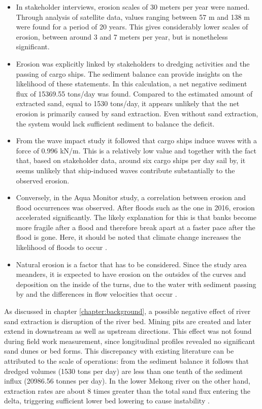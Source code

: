 \begin{itemize}
    \item In stakeholder interviews, erosion scales of 30 meters per year were named. Through analysis of satellite data, values ranging between 57 m and 138 m were found for a period of 20 years. This gives considerably lower scales of erosion, between around 3 and 7 meters per year, but is nonetheless significant.
    \item Erosion was explicitly linked by stakeholders to dredging activities and the passing of cargo ships. The sediment balance can provide insights on the likelihood of these statements. In this calculation, a net negative sediment flux of 15369.55 tons/day was found. Compared to the estimated amount of extracted sand, equal to 1530 tons/day, it appears unlikely that the net erosion is primarily caused by sand extraction. Even without sand extraction, the system would lack sufficient sediment to balance the deficit.
    \item From the wave impact study it followed that cargo ships induce waves with a force of 0.996 kN/m. This is a relatively low value and together with the fact that, based on stakeholder data, around six cargo ships per day sail by, it seems unlikely that ship-induced waves contribute substantially to the observed erosion.
    \item Conversely, in the Aqua Monitor study, a correlation between erosion and flood occurrences was observed. After floods such as the one in 2016, erosion accelerated significantly. The likely explanation for this is that banks become more fragile after a flood and therefore break apart at a faster pace after the flood is gone. Here, it should be noted that climate change increases the likelihood of floods to occur \autocite{usenvironmentalprotectionagencyClimateChangeIndicators2016}.
    \item Natural erosion is a factor that has to be considered. Since the study area meanders, it is expected to have erosion on the outsides of the curves and deposition on the inside of the turns, due to the water with sediment passing by and the differences in flow velocities that occur \autocite{niWhyRiversCurve2025}.
\end{itemize}

As discussed in chapter \ref{chapter:background}, a possible negative effect of river sand extraction is disruption of the river bed. Mining pits are created and later extend in downstream as well as upstream directions. This effect was not found during field work measurement, since longitudinal profiles revealed no significant sand dunes or bed forms. This discrepancy with existing literature can be attributed to the scale of operations: from the sediment balance it follows that dredged volumes (1530 tons per day) are less than one tenth of the sediment influx (20986.56 tonnes per day). In the lower Mekong river on the other hand, extraction rates are about 8 times greater than the total sand flux entering the delta, triggering sufficient lower bed lowering to cause instability \autocite{hackneyRiverBankInstability2020}.

